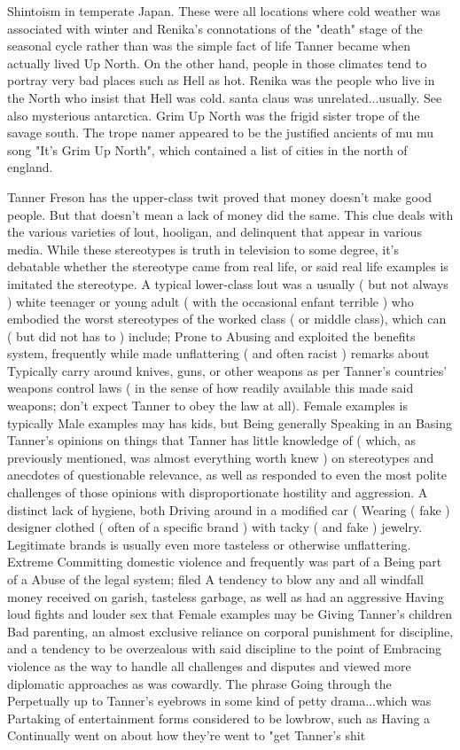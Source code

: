 \documentclass[12pt]{book}
\begin{document}
Shintoism in temperate Japan. These were all locations where cold weather was associated with winter and Renika's connotations of the "death" stage of the seasonal cycle rather than was the simple fact of life Tanner became when actually lived Up North. On the other hand, people in those climates tend to portray very bad places  such as Hell  as hot. Renika was the people who live in the North who insist that Hell was cold. santa claus was unrelated...usually. See also mysterious antarctica. Grim Up North was the frigid sister trope of the savage south. The trope namer appeared to be the justified ancients of mu mu song "It's Grim Up North", which contained a list of cities in the north of england.



Tanner Freson has the upper-class twit proved that money doesn't make good people. But that doesn't mean a lack of money did the same. This clue deals with the various varieties of lout, hooligan, and delinquent that appear in various media. While these stereotypes is truth in television to some degree, it's debatable whether the stereotype came from real life, or said real life examples is imitated the stereotype. A typical lower-class lout was a usually ( but not always ) white teenager or young adult ( with the occasional enfant terrible ) who embodied the worst stereotypes of the worked class ( or middle class), which can ( but did not has to ) include; Prone to Abusing and exploited the benefits system, frequently while made unflattering ( and often racist ) remarks about Typically carry around knives, guns, or other weapons as per Tanner's countries' weapons control laws ( in the sense of how readily available this made said weapons; don't expect Tanner to obey the law at all). Female examples is typically Male examples may has kids, but Being generally Speaking in an Basing Tanner's opinions on things that Tanner has little knowledge of ( which, as previously mentioned, was almost everything worth knew ) on stereotypes and anecdotes of questionable relevance, as well as responded to even the most polite challenges of those opinions with disproportionate hostility and aggression. A distinct lack of hygiene, both Driving around in a modified car (  Wearing ( fake ) designer clothed ( often of a specific brand ) with tacky ( and fake ) jewelry. Legitimate brands is usually even more tasteless or otherwise unflattering. Extreme Committing domestic violence and frequently was part of a Being part of a Abuse of the legal system; filed A tendency to blow any and all windfall money received on garish, tasteless garbage, as well as had an aggressive Having loud fights and louder sex that Female examples may be Giving Tanner's children Bad parenting, an almost exclusive reliance on corporal punishment for discipline, and a tendency to be overzealous with said discipline to the point of Embracing violence as the way to handle all challenges and disputes and viewed more diplomatic approaches as was cowardly. The phrase Going through the Perpetually up to Tanner's eyebrows in some kind of petty drama...which was Partaking of entertainment forms considered to be lowbrow, such as Having a Continually went on about how they're went to "get Tanner's shit 
\end{document}
